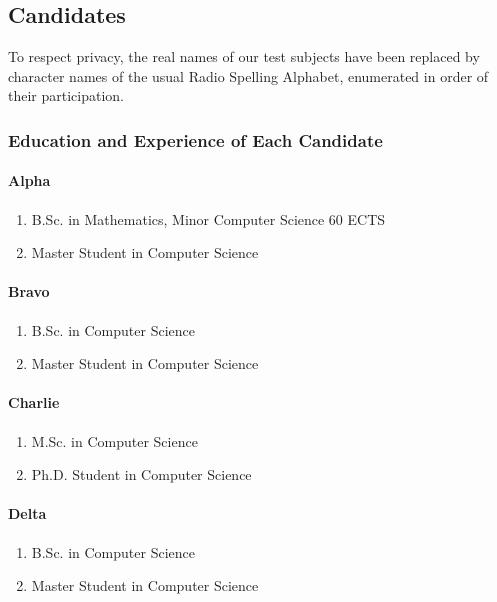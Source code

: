 \documentclass[english]{acm_proc_article-sp}
\begin{document}
\subsection{Candidates}
To respect privacy, the real names of our test subjects have been replaced by character names of the usual Radio Spelling Alphabet, enumerated in order of their participation.

\subsubsection{Education and Experience of Each Candidate}
\paragraph{Alpha} %
\begin{enumerate}[$-$]
\item B.Sc. in Mathematics, Minor Computer Science 60 ECTS
\item Master Student in Computer Science
\end{enumerate}

\paragraph{Bravo} %
\begin{enumerate}[$-$]
\item B.Sc. in Computer Science
\item Master Student  in Computer Science
\end{enumerate}

\paragraph{Charlie} %
\begin{enumerate}[$-$]
\item M.Sc. in Computer Science
\item Ph.D. Student in Computer Science
\end{enumerate}

\paragraph{Delta} %
\begin{enumerate}[$-$]
\item B.Sc. in Computer Science
\item Master Student  in Computer Science
\end{enumerate}
\end{document}
